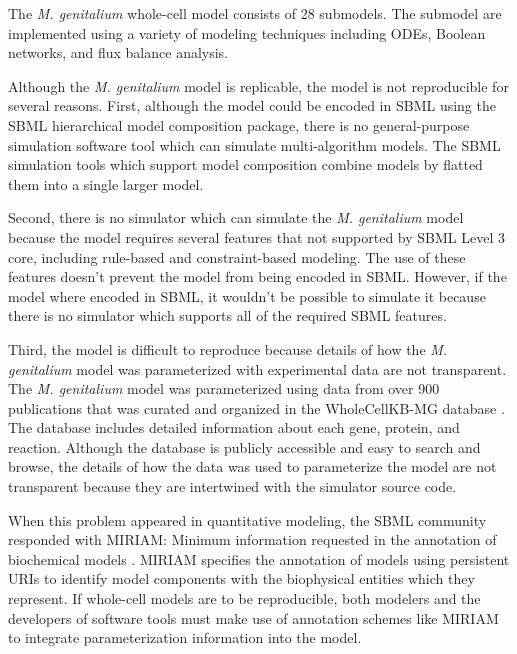 \documentclass[journal,transmag,twoside]{IEEEtran}
\newcommand{\karrcomment}[2]{\pdfmarkupcomment[markup=Highlight,color=yellow,author={Jonathan Karr}]{#1}{#2}}
\begin{document}
The \textit{M. genitalium} whole-cell model \cite{Karr2012} consists of 28 submodels.
The submodel are implemented using a variety of modeling techniques including 
ODEs, Boolean networks, and flux balance analysis.

Although the \textit{M. genitalium} model is replicable, the model is not reproducible for several reasons. First,
although the model could be encoded in SBML using the SBML hierarchical model composition package, there is no 
general-purpose simulation software tool which can simulate multi-algorithm models. The SBML simulation tools which support
model composition combine models by flatted them into a single larger model.

Second, there is no simulator which can simulate the \textit{M. genitalium} model because the model requires several features 
that not supported by SBML Level 3 core, including rule-based and constraint-based modeling.
The use of these features doesn't prevent the model from being encoded in SBML. However, if the model where encoded in SBML,
it wouldn't be possible to simulate it because there is no simulator which supports all of the
required SBML features.

Third, the model is difficult to reproduce because details of how the \textit{M. genitalium} model was parameterized with
experimental data are not transparent. The \textit{M. genitalium} model was parameterized using data from over 900 
publications that was curated and organized in the WholeCellKB-MG database \cite{karr2013wholecellkb}. The database 
includes detailed information about each gene, protein, and reaction. Although the database is publicly accessible and
easy to search and browse, the details of how the data was used to parameterize the model are not transparent 
because they are intertwined with the simulator source code.

When this problem appeared in quantitative modeling, the SBML community responded with MIRIAM:
Minimum information requested in the annotation of biochemical models \cite{novere2005minimum}.
MIRIAM specifies the annotation of models using persistent URIs to identify model
components with the biophysical entities which they represent.
If whole-cell models are to be reproducible, both modelers and the developers of software tools
must make use of annotation schemes like MIRIAM to integrate parameterization information into the model.
\end{document}
